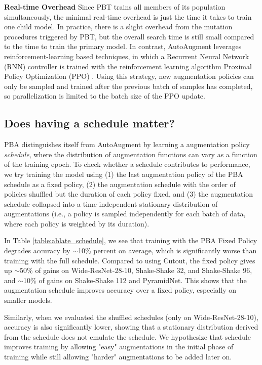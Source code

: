 \documentclass{article}
\begin{document}
\textbf{Real-time Overhead} Since PBT trains all members of its population simultaneously, the minimal real-time overhead is just the time it takes to train one child model. In practice, there is a slight overhead from the mutation procedures triggered by PBT, but the overall search time is still small compared to the time to train the primary model. In contrast, AutoAugment leverages reinforcement-learning based techniques, in which a Recurrent Neural Network (RNN) controller is trained with the reinforcement learning algorithm Proximal Policy Optimization (PPO) \cite{ppo}. Using this strategy, new augmentation policies can only be sampled and trained after the previous batch of samples has completed, so parallelization is limited to the batch size of the PPO update.

\subsection{Does having a schedule matter?}
\label{sec-schedule-matter}

PBA distinguishes itself from AutoAugment by learning a augmentation policy \textit{schedule}, where the distribution of augmentation functions can vary as a function of the training epoch. To check whether a schedule contributes to performance, we try training the model using (1) the last augmentation policy of the PBA schedule as a fixed policy, (2) the augmentation schedule with the order of policies shuffled but the duration of each policy fixed, and (3) the augmentation schedule collapsed into a time-independent stationary distribution of augmentations (i.e., a policy is sampled independently for each batch of data, where each policy is weighted by its duration).

In Table \ref{table:ablate_schedule}, we see that training with the PBA Fixed Policy degrades accuracy by $\sim$10\% percent on average, which is significantly worse than training with the full schedule. Compared to using Cutout, the fixed policy gives up $\sim$50\% of gains on Wide-ResNet-28-10, Shake-Shake 32, and Shake-Shake 96, and $\sim$10\% of gains on Shake-Shake 112 and PyramidNet. This shows that the augmentation schedule improves accuracy over a fixed policy, especially on smaller models.

Similarly, when we evaluated the shuffled schedules (only on Wide-ResNet-28-10), accuracy is also significantly lower, showing that a stationary distribution derived from the schedule does not emulate the schedule. We hypothesize that schedule improves training by allowing "easy" augmentations in the initial phase of training while still allowing "harder" augmentations to be added later on.
\end{document}
